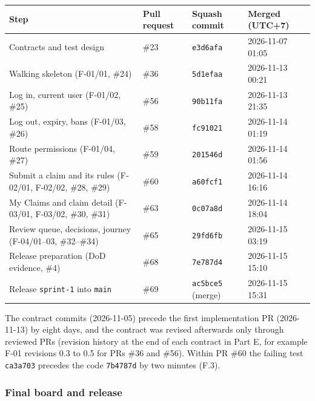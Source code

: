 \begin{center}\small
\begin{tabular}{@{}p{7.6cm}lll@{}}
\toprule \textbf{Step} & \textbf{Pull request} & \textbf{Squash commit} & \textbf{Merged (UTC+7)} \\ \midrule
Contracts and test design & \#23 & \texttt{e3d6afa} & 2026-11-07 01:05 \\
Walking skeleton (F-01/01, \#24) & \#36 & \texttt{5d1efaa} & 2026-11-13 00:21 \\
Log in, current user (F-01/02, \#25) & \#56 & \texttt{90b11fa} & 2026-11-13 21:35 \\
Log out, expiry, bans (F-01/03, \#26) & \#58 & \texttt{fc91021} & 2026-11-14 01:19 \\
Route permissions (F-01/04, \#27) & \#59 & \texttt{201546d} & 2026-11-14 01:56 \\
Submit a claim and its rules (F-02/01, F-02/02, \#28, \#29) & \#60 & \texttt{a60fcf1} & 2026-11-14 16:16 \\
My Claims and claim detail (F-03/01, F-03/02, \#30, \#31) & \#63 & \texttt{0c07a8d} & 2026-11-14 18:04 \\
Review queue, decisions, journey (F-04/01--03, \#32--\#34) & \#65 & \texttt{29fd6fb} & 2026-11-15 03:19 \\
Release preparation (DoD evidence, \#4) & \#68 & \texttt{7e787d4} & 2026-11-15 15:10 \\
Release \texttt{sprint-1} into \texttt{main} & \#69 & \texttt{ac5bce5} (merge) & 2026-11-15 15:31 \\
\bottomrule
\end{tabular}
\end{center}

The contract commits (2026-11-05) precede the first implementation PR (2026-11-13) by eight days, and the contract was revised afterwards only through reviewed PRs (revision history at the end of each contract in Part E, for example F-01 revisions 0.3 to 0.5 for PRs \#36 and \#56).
Within PR \#60 the failing test \texttt{ca3a703} precedes the code \texttt{7b4787d} by two minutes (F.3).

\subsubsection*{Final board and release}


